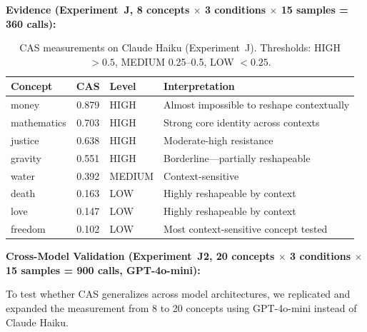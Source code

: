 \documentclass[11pt,a4paper]{article}
\begin{document}
\textbf{Evidence (Experiment~J, 8 concepts $\times$ 3 conditions $\times$ 15 samples = 360 calls):}

\begin{table}[H]
\centering
\caption{CAS measurements on Claude Haiku (Experiment~J). Thresholds: HIGH $> 0.5$, MEDIUM 0.25--0.5, LOW $< 0.25$.}
\begin{tabular}{lcll}
\toprule
\textbf{Concept} & \textbf{CAS} & \textbf{Level} & \textbf{Interpretation} \\
\midrule
money       & 0.879 & HIGH   & Almost impossible to reshape contextually \\
mathematics & 0.703 & HIGH   & Strong core identity across contexts \\
justice     & 0.638 & HIGH   & Moderate-high resistance \\
gravity     & 0.551 & HIGH   & Borderline---partially reshapeable \\
water       & 0.392 & MEDIUM & Context-sensitive \\
death       & 0.163 & LOW    & Highly reshapeable by context \\
love        & 0.147 & LOW    & Highly reshapeable by context \\
freedom     & 0.102 & LOW    & Most context-sensitive concept tested \\
\bottomrule
\end{tabular}
\label{tab:cas-claude}
\end{table}

\textbf{Cross-Model Validation (Experiment~J2, 20 concepts $\times$ 3 conditions $\times$ 15 samples = 900 calls, GPT-4o-mini):}

To test whether CAS generalizes across model architectures, we replicated and expanded the measurement from 8 to 20 concepts using GPT-4o-mini instead of Claude Haiku.
\end{document}
